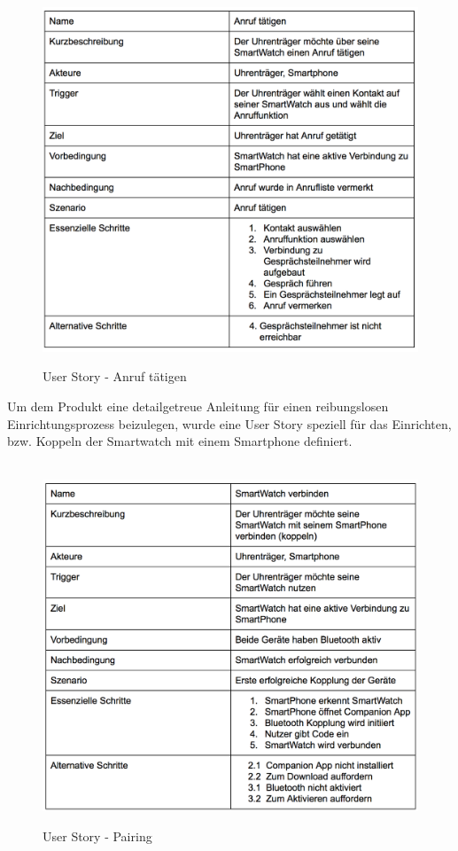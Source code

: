 \begin{figure}[H]
\centering\
\includegraphics[width=14cm]{img/story_out}
\caption{User Story - Anruf tätigen}\label{fig:story-out}
\end{figure}

Um dem Produkt eine detailgetreue Anleitung für einen reibungslosen Einrichtungsprozess beizulegen, wurde eine User Story speziell für das Einrichten, bzw. Koppeln der Smartwatch mit einem Smartphone definiert.
\begin{figure}[H]
\centering\
\includegraphics[width=14cm]{img/story_pairing}
\caption{User Story - Pairing}\label{fig:story-pairing}
\end{figure}

